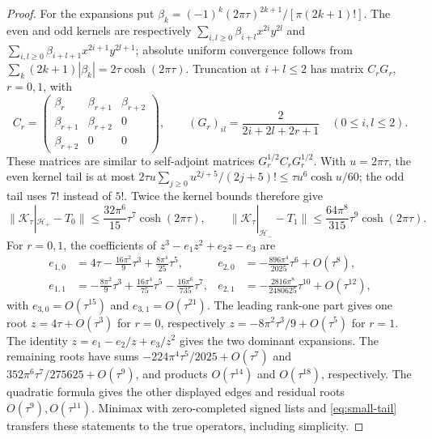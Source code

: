 \begin{proof}
For the expansions put
$\beta_k=(-1)^k(2\pi\tau)^{2k+1}/[\pi(2k+1)!]$.
The even and odd kernels are respectively
$\sum_{i,l\ge0}\beta_{i+l}x^{2i}y^{2l}$ and
$\sum_{i,l\ge0}\beta_{i+l+1}x^{2i+1}y^{2l+1}$; absolute uniform
convergence follows from
$\sum_k(2k+1)|\beta_k|=2\tau\cosh(2\pi\tau)$.
Truncation at $i+l\le2$ has matrix $C_rG_r$, $r=0,1$, with
\[
C_r=\begin{pmatrix}\beta_r&\beta_{r+1}&\beta_{r+2}\\
\beta_{r+1}&\beta_{r+2}&0\\ \beta_{r+2}&0&0\end{pmatrix},
\qquad (G_r)_{il}=\frac2{2i+2l+2r+1}\quad(0\le i,l\le2).
\]
These matrices are similar to self-adjoint matrices
$G_r^{1/2}C_rG_r^{1/2}$. With $u=2\pi\tau$, the even kernel tail is
at most $2\tau u\sum_{j\ge0}u^{2j+5}/(2j+5)!
\le\tau u^6\cosh u/60$; the odd tail uses $7!$ instead of $5!$.
Twice the kernel bounds therefore give
\begin{equation}\label{eq:small-tail}
\|\mathcal K_\tau|_{\mathcal H_+}-T_0\|
\le\frac{32\pi^6}{15}\tau^7\cosh(2\pi\tau),\qquad
\|\mathcal K_\tau|_{\mathcal H_-}-T_1\|
\le\frac{64\pi^8}{315}\tau^9\cosh(2\pi\tau).
\end{equation}
For $r=0,1$, the coefficients of $z^3-e_1z^2+e_2z-e_3$ are
\begin{align*}
e_{1,0}&=4\tau-\frac{16\pi^2}9\tau^3+\frac{8\pi^4}{25}\tau^5,&
e_{2,0}&=-\frac{896\pi^4}{2025}\tau^6+O(\tau^8),\\
e_{1,1}&=-\frac{8\pi^2}9\tau^3+\frac{16\pi^4}{75}\tau^5
-\frac{16\pi^6}{735}\tau^7,&
e_{2,1}&=-\frac{2816\pi^8}{2480625}\tau^{10}+O(\tau^{12}),
\end{align*}
with $e_{3,0}=O(\tau^{15})$ and $e_{3,1}=O(\tau^{21})$.
The leading rank-one part gives one root
$z=4\tau+O(\tau^3)$ for $r=0$, respectively
$z=-8\pi^2\tau^3/9+O(\tau^5)$ for $r=1$.
The identity $z=e_1-e_2/z+e_3/z^2$ gives the two dominant expansions.
The remaining roots have sums
$-224\pi^4\tau^5/2025+O(\tau^7)$ and
$352\pi^6\tau^7/275625+O(\tau^9)$, and products $O(\tau^{14})$
and $O(\tau^{18})$, respectively. The quadratic formula gives the
other displayed edges and residual roots $O(\tau^9),O(\tau^{11})$.
Minimax with zero-completed signed lists and \eqref{eq:small-tail}
transfers these statements to the true operators, including simplicity.
\end{proof}

